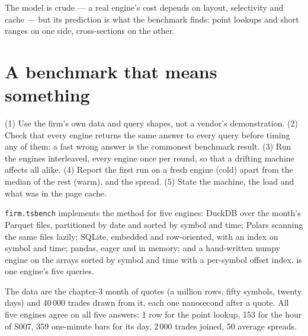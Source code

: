 The model is crude --- a real engine's cost depends on layout, selectivity and cache --- but its prediction is what the benchmark
finds: point lookups and short ranges on one side, cross-sections on the other.

\section{A benchmark that means something}

\begin{method}\label{met:pl:time-series-databases-and-the-alternatives:bench}
(1) Use the firm's own data and query shapes, not a vendor's demonstration. (2) Check that every engine returns the same answer
to every query before timing any of them: a fast wrong answer is the commonest benchmark result. (3) Run the engines interleaved,
every engine once per round, so that a drifting machine affects all alike. (4) Report the first run on a fresh engine (cold)
apart from the median of the rest (warm), and the spread. (5) State the machine, the load and what was in the page cache.
\end{method}

\texttt{firm.tsbench} implements the method for five engines: DuckDB over the month's Parquet files, partitioned by date and
sorted by symbol and time; Polars scanning the same files lazily; SQLite, embedded and row-oriented, with an index on symbol and
time; pandas, eager and in memory; and a hand-written numpy engine on the arrays sorted by symbol and time with a per-symbol
offset index.  is one engine's five queries.

\label{lst:pl:time-series-databases-and-the-alternatives:duck}

The data are the chapter-3 month of quotes (a million rows, fifty symbols, twenty days) and 40\,000 trades drawn from it, each
one nanosecond after a quote. All five engines agree on all five answers: 1 row for the point lookup, 153 for the hour of
S007, 359 one-minute bars for its day, 2\,000 trades joined, 50 average spreads.

